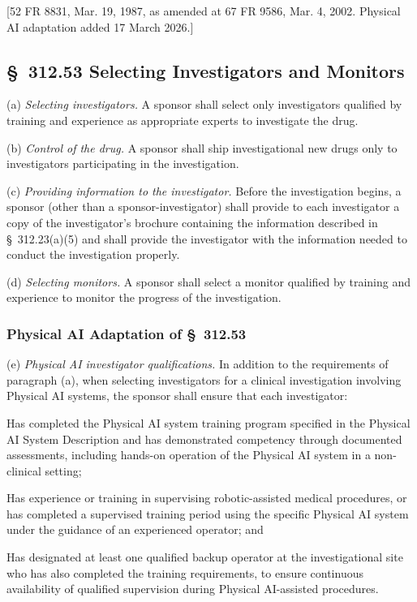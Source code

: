 \documentclass[11pt]{article}
\begin{document}
[52 FR 8831, Mar. 19, 1987, as amended at 67 FR 9586, Mar. 4, 2002. Physical AI adaptation added 17 March 2026.]

\subsection{\S~312.53 Selecting Investigators and Monitors}

(a) \textit{Selecting investigators.} A sponsor shall select only investigators qualified by training and experience as appropriate experts to investigate the drug.

(b) \textit{Control of the drug.} A sponsor shall ship investigational new drugs only to investigators participating in the investigation.

(c) \textit{Providing information to the investigator.} Before the investigation begins, a sponsor (other than a sponsor-investigator) shall provide to each investigator a copy of the investigator's brochure containing the information described in \S~312.23(a)(5) and shall provide the investigator with the information needed to conduct the investigation properly.

(d) \textit{Selecting monitors.} A sponsor shall select a monitor qualified by training and experience to monitor the progress of the investigation.

\subsubsection{Physical AI Adaptation of \S~312.53}

(e) \textit{Physical AI investigator qualifications.} In addition to the requirements of paragraph (a), when selecting investigators for a clinical investigation involving Physical AI systems, the sponsor shall ensure that each investigator:

\begin{description}[leftmargin=0.8cm,style=sameline]
\item[(i)] Has completed the Physical AI system training program specified in the Physical AI System Description and has demonstrated competency through documented assessments, including hands-on operation of the Physical AI system in a non-clinical setting;
\item[(ii)] Has experience or training in supervising robotic-assisted medical procedures, or has completed a supervised training period using the specific Physical AI system under the guidance of an experienced operator; and
\item[(iii)] Has designated at least one qualified backup operator at the investigational site who has also completed the training requirements, to ensure continuous availability of qualified supervision during Physical AI-assisted procedures.
\end{description}
\end{document}
